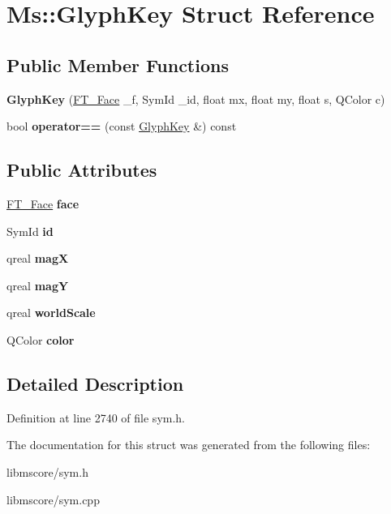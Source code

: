 \hypertarget{struct_ms_1_1_glyph_key}{}\section{Ms\+:\+:Glyph\+Key Struct Reference}
\label{struct_ms_1_1_glyph_key}
\subsection*{Public Member Functions}
\begin{DoxyCompactItemize}
\item 
\mbox{\label{struct_ms_1_1_glyph_key_a18ee657bdcc61f28d24ea0ac053b078b}} 
{\bfseries Glyph\+Key} (\hyperlink{struct_f_t___face_rec__}{F\+T\+\_\+\+Face} \+\_\+f, Sym\+Id \+\_\+id, float mx, float my, float s, Q\+Color c)
\item 
\mbox{\label{struct_ms_1_1_glyph_key_a44b95bbb427a10d67798087009b308b1}} 
bool {\bfseries operator==} (const \hyperlink{struct_ms_1_1_glyph_key}{Glyph\+Key} \&) const
\end{DoxyCompactItemize}
\subsection*{Public Attributes}
\begin{DoxyCompactItemize}
\item 
\mbox{\label{struct_ms_1_1_glyph_key_a1652ba89f75c0738b9cf07679deffdb8}} 
\hyperlink{struct_f_t___face_rec__}{F\+T\+\_\+\+Face} {\bfseries face}
\item 
\mbox{\label{struct_ms_1_1_glyph_key_ada3e2eef1995f195e2ae443e89cd2768}} 
Sym\+Id {\bfseries id}
\item 
\mbox{\label{struct_ms_1_1_glyph_key_a2f0b2730e9cce23bb897423bf3c522ba}} 
qreal {\bfseries magX}
\item 
\mbox{\label{struct_ms_1_1_glyph_key_a34f78736745ecbb21a1da8197fce7a38}} 
qreal {\bfseries magY}
\item 
\mbox{\label{struct_ms_1_1_glyph_key_a8d4c4963abcd145ae7bffe6a6d1951d6}} 
qreal {\bfseries world\+Scale}
\item 
\mbox{\label{struct_ms_1_1_glyph_key_a20f1efe847285c988c13e30813ba54e9}} 
Q\+Color {\bfseries color}
\end{DoxyCompactItemize}


\subsection{Detailed Description}


Definition at line 2740 of file sym.\+h.



The documentation for this struct was generated from the following files\+:\begin{DoxyCompactItemize}
\item 
libmscore/sym.\+h\item 
libmscore/sym.\+cpp\end{DoxyCompactItemize}
